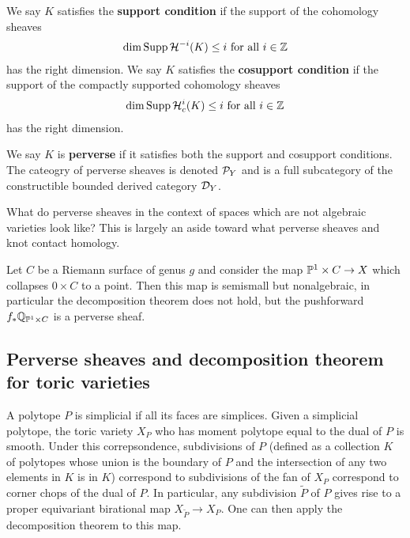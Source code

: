 \documentclass[12pt]{article}
\begin{document}
\begin{definition}
    We say $K$ satisfies
    the \textbf{support condition} if the support of the cohomology sheaves
    \begin{align*}
        \dim{\Supp \cH^{-i}(K)} \leq i \text{ for all } i\in \Z
    \end{align*} has the right dimension. We say $K$
    satisfies the \textbf{cosupport condition} if the support of the compactly supported
    cohomology sheaves \begin{align*}
        \dim{\Supp \cH^{i}_c(K)} \leq i \text{ for all } i\in \Z
    \end{align*} has the right dimension.

    We say $K$ is \textbf{perverse} if it satisfies both the support and cosupport conditions.
    The cateogry of perverse sheaves is denoted $\cP_Y$ and is a full subcategory of
    the constructible bounded derived category $\cD_Y$.
\end{definition}

\begin{remark}
    What do perverse sheaves in the context of
    spaces which are not algebraic varieties look like?
    This is largely an aside toward what perverse sheaves
    and knot contact homology.
\end{remark}

\begin{example}
    Let $C$ be a Riemann surface of genus $g$ and consider the map
    $\P^1\times C \to X$ which collapses $0\times C$ to a point. Then this map
    is semismall but nonalgebraic, in particular the decomposition theorem does not hold, but
    the pushforward $f_*\Q_{\P^1\times C}$ is a perverse sheaf.
\end{example}

\subsection{Perverse sheaves and decomposition theorem for toric varieties}
A polytope $P$ is simplicial if all its faces are simplices. Given
a simplicial polytope, the toric variety $X_P$ who has moment polytope equal to
the dual of $P$ is smooth. Under this correpsondence, subdivisions of $P$ (defined as
a collection $K$ of polytopes whose union is the boundary of $P$ and the intersection of
any two elements in $K$ is in $K$)
correspond to subdivisions of the fan of $X_P$ correspond to corner chops of the dual of $P$. In
particular, any subdivision $\tilde P$ of $P$ gives rise to a proper equivariant
birational map $X_{\tilde P} \to X_P$. One can then apply the
decomposition theorem to this map.
\end{document}
